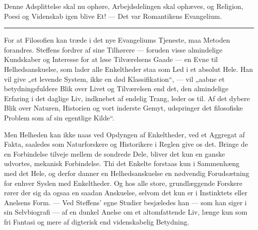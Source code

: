 \documentclass[12pt,a4paper,openany]{book}
\newcommand{\opage}[1]{\marginnote{\footnotesize\textit{[#1]}}}
\begin{document}
Denne Adsplittelse skal nu ophøre, Arbejdsdelingen skal ophæves, og Religion,
Poesi og Videnskab igen blive Et! --- Det var Romantikens Evangelium.

\begin{center}\rule{2cm}{0.4pt}\end{center}

\setcounter{footnote}{0}%
\opage{44}For at Filosofien kan træde i det nye Evangeliums Tjeneste, maa
Metoden forandres. Steffens fordrer af sine Tilhørere --- foruden visse
almindelige Kundskaber og Interesse for at løse Tilværelsens Gaade --- en Evne
til Helhedsanskuelse, som lader alle Enkeltheder staa som Led i et absolut
Hele. Han vil give „et levende System, ikke en død Klassifikation“, --- vil
„aabne et betydningsfuldere Blik over Livet og Tilværelsen end det, den
almindelige Erfaring i det daglige Liv, indknebet af endelig Trang, leder os
til. Af det dybere Blik over Naturen, Historien og vort inderste Gemyt,
udspringer det filosofiske Problem som af sin egentlige Kilde“.

Men Helheden kan ikke naas ved Opdyngen af Enkeltheder, ved et Aggregat af
Fakta, saaledes som Naturforskere og Historikere i Reglen give os det. Bringe
de en Forbindelse tilveje mellem de sondrede Dele, bliver det kun en ganske
udvortes, mekanisk Forbindelse. Thi det Enkelte forstaas kun i Sammenhæng med
det Hele, og derfor danner en Helhedsanskuelse en nødvendig Forudsætning for
enhver Syslen med Enkeltheder. Og hos alle store, grundlæggende Forskere rører
der sig da ogsaa en saadan Anskuelse, selvom det kun er i Instinktets eller
Anelsens Form. --- Ved Steffens' egne Studier besjæledes han --- som han siger
i sin Selvbiografi --- af en dunkel Anelse om et altomfattende Liv, længe kun
som fri Fantasi og mere af digterisk end videnskabelig Betydning.
\end{document}
